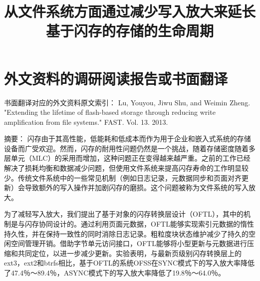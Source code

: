 


\chapter{外文资料的调研阅读报告或书面翻译}

{\heiti 书面翻译对应的外文资料原文索引：} Lu, Youyou, Jiwu Shu, and Weimin Zheng. "Extending the lifetime of flash-based storage through reducing write amplification from file systems." FAST. Vol. 13. 2013.

\title{从文件系统方面通过减少写入放大来延长基于闪存的存储的生命周期}

{\heiti 摘要：} 闪存由于其高性能，低能耗和低成本而作为用于企业和嵌入式系统的存储设备而广受欢迎。然而，闪存的耐用性问题仍然是一个挑战，随着存储密度随着多层单元（MLC）的采用而增加，这种问题正在变得越来越严重。之前的工作已经解决了损耗均衡和数据减少问题，但使用文件系统来提高闪存寿命的工作明显较少。传统文件系统中的一些常见机制（例如日志记录，元数据同步和页面对齐更新）会导致额外的写入操作并加剧闪存的磨损。这个问题被称为文件系统的写入放大。

为了减轻写入放大，我们提出了基于对象的闪存转换层设计（OFTL），其中的机制是与闪存协同设计的。通过利用页面元数据，OFTL能够实现索引元数据的惰性持久性，并在保持一致性的同时消除日志记录。粗粒度块状态维护减少了持久的空闲空间管理开销。借助字节单元访问接口，OFTL能够将小型更新与元数据进行压缩和共同定位，以进一步减少更新。实验表明，与最新页级别闪存转换层上的ext3，ext2和btrfs相比，基于OFTL的系统OFSS在SYNC模式下的写入放大率降低了47.4％〜89.4％，ASYNC模式下的写入放大率降低了19.8％〜64.0％。

